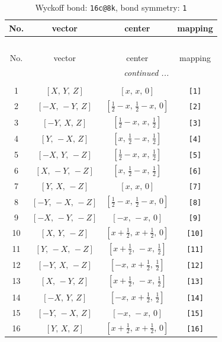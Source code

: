 \documentclass[fleqn,8pt]{jsarticle}
\begin{document}
\begin{longtable}{cccc}
\caption{Wyckoff bond: {\tt 16c@8k}, bond symmetry: {\tt 1}}
 \\
 \hline \hline
No. & vector & center & mapping \\ \hline \endfirsthead

\multicolumn{3}{l}{\tablename\ \thetable{}} \\
 \hline \hline
No. & vector & center & mapping \\ \hline \endhead

 \hline \hline
\multicolumn{3}{r}{\footnotesize\it continued ...} \\ \endfoot

 \hline \hline
\multicolumn{3}{r}{} \\ \endlastfoot

1 & $\left[ X,\, Y,\, Z \right]$ & $\left[ x,\, x,\, 0 \right]$ & {\tt [1]} \\ \hline
2 & $\left[ - X,\, - Y,\, Z \right]$ & $\left[ \frac{1}{2} - x,\, \frac{1}{2} - x,\, 0 \right]$ & {\tt [2]} \\ \hline
3 & $\left[ - Y,\, X,\, Z \right]$ & $\left[ \frac{1}{2} - x,\, x,\, \frac{1}{2} \right]$ & {\tt [3]} \\ \hline
4 & $\left[ Y,\, - X,\, Z \right]$ & $\left[ x,\, \frac{1}{2} - x,\, \frac{1}{2} \right]$ & {\tt [4]} \\ \hline
5 & $\left[ - X,\, Y,\, - Z \right]$ & $\left[ \frac{1}{2} - x,\, x,\, \frac{1}{2} \right]$ & {\tt [5]} \\ \hline
6 & $\left[ X,\, - Y,\, - Z \right]$ & $\left[ x,\, \frac{1}{2} - x,\, \frac{1}{2} \right]$ & {\tt [6]} \\ \hline
7 & $\left[ Y,\, X,\, - Z \right]$ & $\left[ x,\, x,\, 0 \right]$ & {\tt [7]} \\ \hline
8 & $\left[ - Y,\, - X,\, - Z \right]$ & $\left[ \frac{1}{2} - x,\, \frac{1}{2} - x,\, 0 \right]$ & {\tt [8]} \\ \hline
9 & $\left[ - X,\, - Y,\, - Z \right]$ & $\left[ - x,\, - x,\, 0 \right]$ & {\tt [9]} \\ \hline
10 & $\left[ X,\, Y,\, - Z \right]$ & $\left[ x + \frac{1}{2},\, x + \frac{1}{2},\, 0 \right]$ & {\tt [10]} \\ \hline
11 & $\left[ Y,\, - X,\, - Z \right]$ & $\left[ x + \frac{1}{2},\, - x,\, \frac{1}{2} \right]$ & {\tt [11]} \\ \hline
12 & $\left[ - Y,\, X,\, - Z \right]$ & $\left[ - x,\, x + \frac{1}{2},\, \frac{1}{2} \right]$ & {\tt [12]} \\ \hline
13 & $\left[ X,\, - Y,\, Z \right]$ & $\left[ x + \frac{1}{2},\, - x,\, \frac{1}{2} \right]$ & {\tt [13]} \\ \hline
14 & $\left[ - X,\, Y,\, Z \right]$ & $\left[ - x,\, x + \frac{1}{2},\, \frac{1}{2} \right]$ & {\tt [14]} \\ \hline
15 & $\left[ - Y,\, - X,\, Z \right]$ & $\left[ - x,\, - x,\, 0 \right]$ & {\tt [15]} \\ \hline
16 & $\left[ Y,\, X,\, Z \right]$ & $\left[ x + \frac{1}{2},\, x + \frac{1}{2},\, 0 \right]$ & {\tt [16]} \\
\end{longtable}
\end{document}
